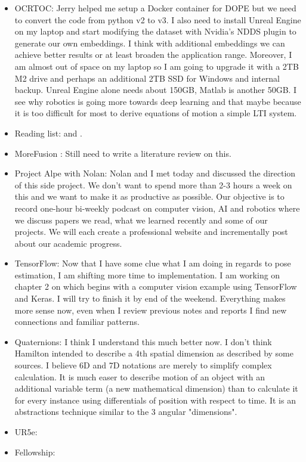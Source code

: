 \documentclass[11pt]{article}
\begin{document}
\begin{itemize}
	\item OCRTOC: Jerry helped me setup a Docker container for DOPE but we need to convert the code from python v2 to v3. I also need to install Unreal Engine on my laptop and start modifying the dataset with Nvidia's NDDS plugin to generate our own embeddings. I think with additional
	      embeddings we can achieve better results or at least broaden the
	      application range. Moreover, I am almost out of space on my laptop so I am going to upgrade it with a 2TB M2 drive and perhaps an additional 2TB SSD for Windows and internal backup. Unreal Engine alone needs about
	      150GB, Matlab is another 50GB. I see why robotics is going more towards deep learning and that maybe because it is too difficult for most to derive equations of motion a simple LTI system.

	\item Reading list: \cite{lampinen2001bayesian} and \cite{li2019survey}.

	\item MoreFusion \cite{MoreFusion}: Still need to write a literature review on this.

	\item Project Alpe with Nolan: Nolan and I met today and discussed the direction of this side project. We don't want to spend more than 2-3 hours a week on this and we want to make it as productive as possible. Our objective is to record one-hour bi-weekly podcast on computer vision, AI and robotics where we discuss papers we read, what we learned recently and some of our projects. We will each create a professional website and incrementally post about our academic progress.

	\item TensorFlow: Now that I have some clue what I am doing in regards to pose estimation, I am shifting more time to implementation. I am working on chapter 2 on \cite{planche2019hands} which begins with a computer vision example using TensorFlow and Keras. I will try to finish it by end of the weekend. Everything makes more sense now, even when I review previous notes and reports I find new connections and familiar patterns.

	\item Quaternions: I think I understand this much better now. I don't think Hamilton intended to describe a 4th spatial dimension as described by some sources. I believe 6D and 7D notations are merely to simplify complex calculation. It is much easer to describe motion of an object with an additional variable term (a new mathematical dimension) than to calculate it for every instance using differentials of position with respect to time. It is an abstractions technique similar to the 3 angular "dimensions".

	\item UR5e:

	\item Fellowship:




\end{itemize}
\end{document}
